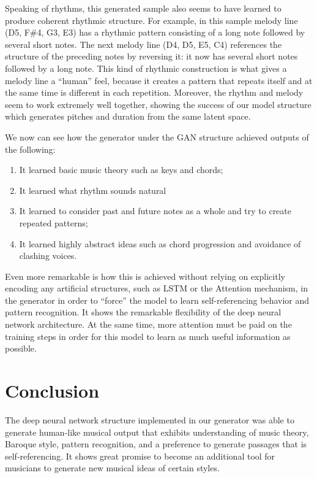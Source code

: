 \documentclass[12pt,oneside]{chicagocapstone}
\providecommand{\tightlist}{%
  \setlength{\itemsep}{0pt}\setlength{\parskip}{0pt}}
\begin{document}
Speaking of rhythms, this generated sample also seems to have learned to produce coherent rhythmic structure. For example, in this sample melody line (D5, F\#4, G3, E3) has a rhythmic pattern consisting of a long note followed by several short notes. The next melody line (D4, D5, E5, C4) references the structure of the preceding notes by reversing it: it now has several short notes followed by a long note. This kind of rhythmic construction is what gives a melody line a ``human'' feel, because it creates a pattern that repeats itself and at the same time is different in each repetition. Moreover, the rhythm and melody seem to work extremely well together, showing the success of our model structure which generates pitches and duration from the same latent space.

We now can see how the generator under the GAN structure achieved outputs of the following:
\begin{enumerate}
\def\labelenumi{\arabic{enumi}.}
\tightlist
\item
  It learned basic music theory such as keys and chords;
\item
  It learned what rhythm sounds natural
\item
  It learned to consider past and future notes as a whole and try to create repeated patterns;
\item
  It learned highly abstract ideas such as chord progression and avoidance of clashing voices.
\end{enumerate}
Even more remarkable is how this is achieved without relying on explicitly encoding any artificial structures, such as LSTM or the Attention mechanism, in the generator in order to ``force'' the model to learn self-referencing behavior and pattern recognition. It shows the remarkable flexibility of the deep neural network architecture. At the same time, more attention must be paid on the training steps in order for this model to learn as much useful information as possible.

\hypertarget{conclusion}{%
\chapter*{Conclusion}\label{conclusion}}

The deep neural network structure implemented in our generator was able to generate human-like musical output that exhibits understanding of music theory, Baroque style, pattern recognition, and a preference to generate passages that is self-referencing. It shows great promise to become an additional tool for musicians to generate new musical ideas of certain styles.
\end{document}
